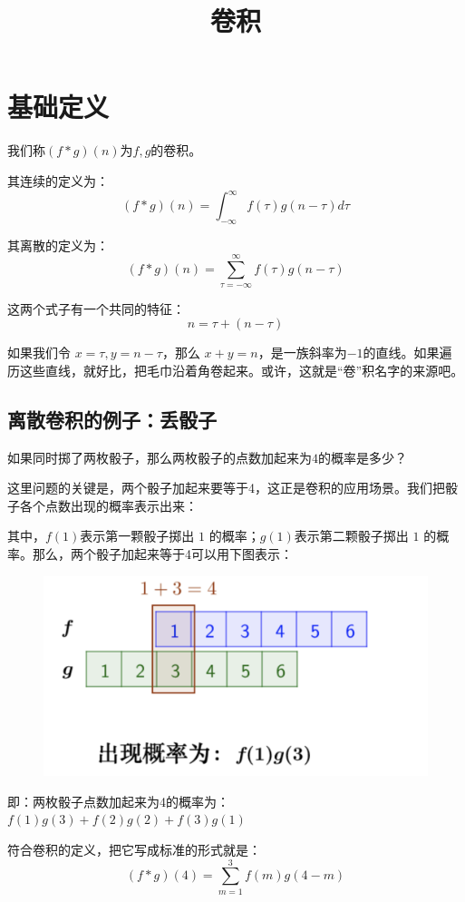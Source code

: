 \documentclass[12pt]{article}
\title{卷积\cite{Understand_Convolution}}
\begin{document}
\maketitle

\section{基础定义}
我们称$(f*g)(n)$为$f,g$的卷积。

其连续的定义为：
$$
(f*g)(n)=\int_{-\infty}^{\infty}f(\tau)g(n-\tau)d\tau
$$

其离散的定义为：
$$
(f*g)(n)=\sum _{\tau=-\infty }^{\infty}{f(\tau)g(n-\tau)}
$$

这两个式子有一个共同的特征：
$$
n = \tau + (n - \tau)
$$

如果我们令 $x = \tau, y = n - \tau$，那么 $x + y = n$，是一族斜率为$-1$的直线。如果遍历这些直线，就好比，把毛巾沿着角卷起来。或许，这就是“卷”积名字的来源吧。

\subsection{离散卷积的例子：丢骰子}
如果同时掷了两枚骰子，那么两枚骰子的点数加起来为$4$的概率是多少？

这里问题的关键是，两个骰子加起来要等于4，这正是卷积的应用场景。我们把骰子各个点数出现的概率表示出来：

其中，$f(1)$表示第一颗骰子掷出 $1$ 的概率；$g(1)$表示第二颗骰子掷出 $1$ 的概率。那么，两个骰子加起来等于4可以用下图表示：

\begin{figure}[H]
  \centering
  \includegraphics[width=.8\textwidth]{fig/convulution_two_dices.png} 
\end{figure}

即：两枚骰子点数加起来为4的概率为：
$f(1)g(3)+f(2)g(2)+f(3)g(1)$

符合卷积的定义，把它写成标准的形式就是：
$$
(f*g)(4)=\sum_{m=1}^{3}f(m)g(4-m)
$$
\end{document}
